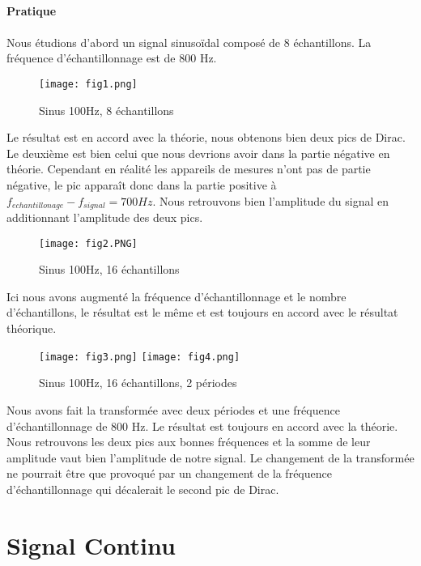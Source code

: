 \documentclass[oneside,a4paper,12pt]{article}
\begin{document}
	\paragraph{Pratique}\paragraph{}
	Nous étudions d’abord un signal sinusoïdal composé de 8 échantillons. La fréquence d’échantillonnage est de 800 Hz. 
	
	\begin{figure}[h]
		\centering
		\texttt{[image: fig1.png]}
		\caption{Sinus 100Hz, 8 échantillons}
	\end{figure}

	Le résultat est en accord avec la théorie, nous obtenons bien deux pics de Dirac. Le deuxième est bien celui que nous devrions avoir dans la partie négative en théorie. Cependant en réalité les appareils de mesures n’ont pas de partie négative, le pic apparaît donc dans la partie positive à $f_{echantillonage}-f_{signal} = 700 Hz$. Nous retrouvons bien l’amplitude du signal en additionnant l’amplitude des deux pics.
	
	\begin{figure}[h]
		\centering
		\texttt{[image: fig2.PNG]}
		\caption{Sinus 100Hz, 16 échantillons}
	\end{figure}

	Ici nous avons augmenté la fréquence d'échantillonnage et le nombre d'échantillons, le résultat est le même et est toujours en accord avec le résultat théorique.\\
	\newpage
	
	\begin{figure}[t]
		\centering
		\texttt{[image: fig3.png]}
		\texttt{[image: fig4.png]}
		\caption{Sinus 100Hz, 16 échantillons, 2 périodes}
	\end{figure}

	Nous avons fait la transformée avec deux périodes et une fréquence d’échantillonnage de 800 Hz. Le résultat est toujours en accord avec la théorie. Nous retrouvons les deux pics aux bonnes fréquences et la somme de leur amplitude vaut bien l’amplitude de notre signal. Le changement de la transformée ne pourrait être que provoqué par un changement de la fréquence d’échantillonnage qui décalerait le second pic de Dirac.
	
	\newpage
	
	\section{Signal Continu}
	
\end{document}
